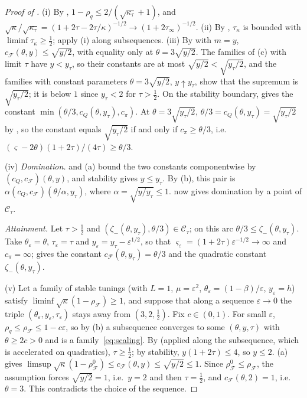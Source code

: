 \documentclass[11pt]{article}
\theoremstyle{definition}
\theoremstyle{remark}
\newcommand{\cF}{\mathcal F}
\newcommand{\rhoF}{\rho_{\cF}}
\newcommand{\rhoz}{\rho_{\cF}^{0}}
\newcommand{\cQ}{c_{Q}}
\newcommand{\cFF}{c_{\cF}}
\newcommand{\cpi}{c_{\pi}}
\begin{document}
\begin{proof}[Proof of ]
(i) By ,
\(1-\rho_q\le2/(\sqrt{\kappa_\tau}+1)\), and
\(\sqrt\kappa/\sqrt{\kappa_\tau}=(1+2\tau-2\tau/\kappa)^{-1/2}\to(1+2\tau_\infty)^{-1/2}\).
(ii) By , \(\tau_\kappa\) is bounded with
\(\liminf\tau_\kappa\ge\frac12\); apply (i) along subsequences.
(iii) By  with \(m=y\), \(\cFF(\theta,y)\le\sqrt{y/2}\), with equality only at \(\theta=3\sqrt{y/2}\).  The families
of (c) with limit \(\tau\) have \(y<y_\tau\), so their constants are at most \(\sqrt{y/2}<\sqrt{y_\tau/2}\), and the families with
constant parameters \(\theta=3\sqrt{y/2}\), \(y\uparrow y_\tau\), show that the supremum is \(\sqrt{y_\tau/2}\); it is below \(1\) since
\(y_\tau<2\) for \(\tau>\frac12\).  On the stability boundary,  gives the constant
\(\min(\theta/3,\cQ(\theta,y_\tau),\cpi)\).  At \(\theta=3\sqrt{y_\tau/2}\), \(\theta/3=\cQ(\theta,y_\tau)=\sqrt{y_\tau/2}\) by , so the
constant equals \(\sqrt{y_\tau/2}\) if and only if \(\cpi\ge\theta/3\), i.e.\ \((\varsigma-2\theta)(1+2\tau)/(4\tau)\ge\theta/3\).

(iv) \emph{Domination.}   and (a) bound the two
constants componentwise by \((\cQ,\cFF)(\theta,y)\), and stability
gives \(y\le y_\tau\).  By (b), this pair is
\(\alpha(\cQ,\cFF)(\theta/\alpha,y_\tau)\), where
\(\alpha=\sqrt{y/y_\tau}\le1\).   now gives
domination by a point of \(\mathcal C_\tau\).

\emph{Attainment.}  Let \(\tau>\frac12\) and \((\zeta_-(\theta,y_\tau),\theta/3)\in\mathcal C_\tau\); on this arc
\(\theta/3\le\zeta_-(\theta,y_\tau)\).  Take \(\theta_\varepsilon=\theta\), \(\tau_\varepsilon=\tau\) and \(y_\varepsilon=y_\tau-\varepsilon^{1/2}\), so that
\(\varsigma_\varepsilon=(1+2\tau)\varepsilon^{-1/2}\to\infty\) and \(\cpi=\infty\);  gives the constant \(\cFF(\theta,y_\tau)=\theta/3\) and
 the quadratic constant \(\zeta_-(\theta,y_\tau)\).

(v) Let a family of stable tunings (with \(L=1\),
\(\mu=\varepsilon^2\), \(\theta_\varepsilon=(1-\beta)/\varepsilon\), \(y_\varepsilon=h\)) satisfy
\(\liminf\sqrt\kappa(1-\rhoF)\ge1\), and suppose that along a sequence \(\varepsilon\to0\) the triple
\((\theta_\varepsilon,y_\varepsilon,\tau_\varepsilon)\) stays away from \((3,2,\frac12)\).  Fix \(c\in(0,1)\).  For small \(\varepsilon\),
\(\rho_q\le\rhoF\le1-c\varepsilon\), so by (b) a subsequence converges to some \((\theta,y,\tau)\) with \(\theta\ge2c>0\) and is a
family~\eqref{eq:scaling}.  By  (applied along the subsequence, which
is accelerated on quadratics), \(\tau\ge\frac12\); by stability, \(y(1+2\tau)\le4\), so \(y\le2\).
(a) gives \(\limsup\sqrt\kappa(1-\rhoz)\le\cFF(\theta,y)\le\sqrt{y/2}\le1\).  Since
\(\rhoz\le\rhoF\), the assumption forces \(\sqrt{y/2}=1\), i.e.\ \(y=2\) and then \(\tau=\frac12\), and
\(\cFF(\theta,2)=1\), i.e.\ \(\theta=3\).  This contradicts the choice of the sequence.
\end{proof}
\end{document}
